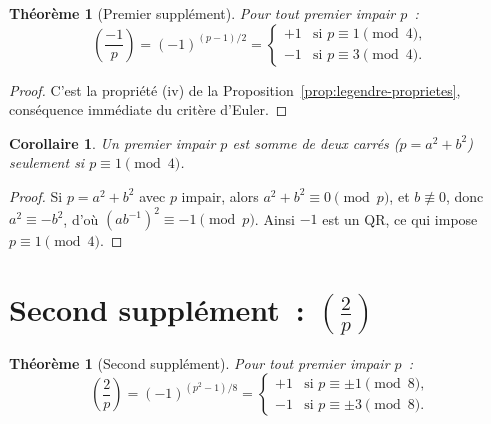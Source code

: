 \documentclass[12pt,a4paper,openany]{book}
\theoremstyle{definition}
\theoremstyle{plain}
\newtheorem{theoreme}[definition]{Théorème}
\newtheorem{corollaire}[definition]{Corollaire}
\theoremstyle{remark}
\newcommand{\legendre}[2]{\left(\frac{#1}{#2}\right)}
\begin{document}
\begin{theoreme}[Premier supplément]
\label{thm:premier-supplement}
Pour tout premier impair $p$~:
\[
  \legendre{-1}{p} = (-1)^{(p-1)/2} =
  \begin{cases}
    +1 & \text{si } p \equiv 1 \pmod{4}, \\
    -1 & \text{si } p \equiv 3 \pmod{4}.
  \end{cases}
\]
\end{theoreme}

\begin{proof}
C'est la propriété (iv) de la Proposition~\ref{prop:legendre-proprietes},
conséquence immédiate du critère d'Euler.
\end{proof}

\begin{corollaire}
\label{cor:somme-deux-carres-premier}
Un premier impair $p$ est somme de deux carrés ($p = a^2 + b^2$) seulement si
$p \equiv 1 \pmod{4}$.
\end{corollaire}

\begin{proof}
Si $p = a^2 + b^2$ avec $p$ impair, alors $a^2 + b^2 \equiv 0 \pmod{p}$, et
$b \not\equiv 0$, donc $a^2 \equiv -b^2$, d'où $(ab^{-1})^2 \equiv -1 \pmod{p}$.
Ainsi $-1$ est un QR, ce qui impose $p \equiv 1 \pmod{4}$.
\end{proof}

\section{Second supplément~: $\legendre{2}{p}$}
\label{sec:qr:supplement2}

\begin{theoreme}[Second supplément]
\label{thm:second-supplement}
Pour tout premier impair $p$~:
\[
  \legendre{2}{p} = (-1)^{(p^2-1)/8} =
  \begin{cases}
    +1 & \text{si } p \equiv \pm 1 \pmod{8}, \\
    -1 & \text{si } p \equiv \pm 3 \pmod{8}.
  \end{cases}
\]
\end{theoreme}
\end{document}
